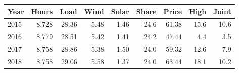 \begin{tabular}{lrrrrrrrr}
\toprule
Year & Hours & Load & Wind & Solar & Share & Price & High & Joint \\
\midrule
2015 & 8,728 & 28.36 & 5.48 & 1.46 & 24.6 & 61.38 & 15.6 & 10.6 \\
2016 & 8,779 & 28.51 & 5.42 & 1.41 & 24.2 & 47.44 & 4.4 & 3.5 \\
2017 & 8,758 & 28.86 & 5.38 & 1.50 & 24.0 & 59.32 & 12.6 & 7.9 \\
2018 & 8,758 & 29.06 & 5.58 & 1.37 & 24.0 & 63.44 & 18.1 & 10.2 \\
\bottomrule
\end{tabular}
